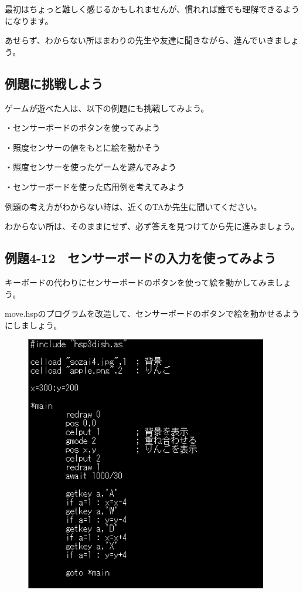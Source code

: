 最初はちょっと難しく感じるかもしれませんが、慣れれば誰でも理解できるようになります。

あせらず、わからない所はまわりの先生や友達に聞きながら、進んでいきましょう。

\subsection{例題に挑戦しよう}

ゲームが遊べた人は、以下の例題にも挑戦してみよう。

・センサーボードのボタンを使ってみよう

・照度センサーの値をもとに絵を動かそう

・照度センサーを使ったゲームを遊んでみよう

・センサーボードを使った応用例を考えてみよう


例題の考え方がわからない時は、近くのTAか先生に聞いてください。

わからない所は、そのままにせず、必ず答えを見つけてから先に進みましょう。

\newpage
\subsection{例題4-12　センサーボードの入力を使ってみよう}


\begin{description}
    \item {}
\end{description}

キーボードの代わりにセンサーボードのボタンを使って絵を動かしてみましょう。

move.hspのプログラムを改造して、センサーボードのボタンで絵を動かせるようにしましょう。

\begin{figure}[H]
    \begin{center}
      \includegraphics[keepaspectratio,width=10.61cm,height=11.229cm]{text04-img/s_move.png}
    \end{center}
    \label{fig:prog_menu}
\end{figure}

